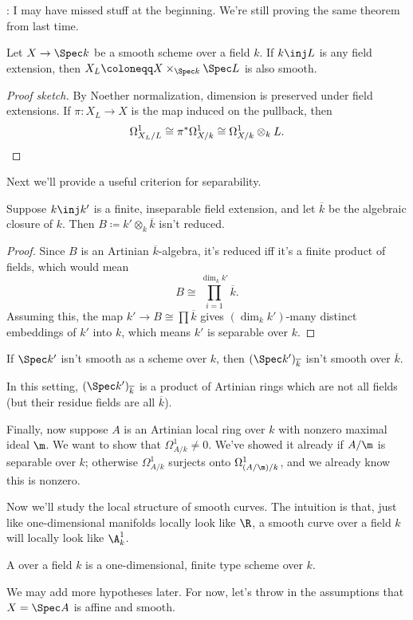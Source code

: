 \TODO: I may have missed stuff at the beginning. We're still proving the same theorem from last time.
\begin{lem}
Let $X\to\Spec k$ be a smooth scheme over a field $k$. If $k\inj L$ is any field extension, then $X_L\coloneqq
X\times_{\Spec k}\Spec L$ is also smooth.
\end{lem}
\begin{proof}[Proof sketch]
By Noether normalization, dimension is preserved under field extensions. If $\pi\colon X_L\to X$ is the map induced
on the pullback, then
\begin{equation}
	\Omega_{X_L/L}^1\cong \pi^*\Omega_{X/k}^1\cong \Omega^1_{X/k}\otimes_k L. \qedhere
\end{equation}
\end{proof}
Next we'll provide a useful criterion for separability.
\begin{lem}
Suppose $k\inj k'$ is a finite, inseparable field extension, and let $\overline k$ be the algebraic closure of $k$.
Then $B\coloneqq k'\otimes_k \overline k$ isn't reduced.
\end{lem}
\begin{proof}
Since $B$ is an Artinian $\overline k$-algebra, it's reduced iff it's a finite product of fields, which would mean
\begin{equation}
	B\cong \prod_{i=1}^{\dim_k k'} \overline k.
\end{equation}
Assuming this, the map $k'\to B\cong\prod \overline k$ gives $(\dim_k k')$-many distinct embeddings of $k'$ into
$k$, which means $k'$ is separable over $k$.
\end{proof}
\begin{cor}
If $\Spec k'$ isn't smooth as a scheme over $k$, then $(\Spec k')_{\overline k}$ isn't smooth over $\overline k$.
\end{cor}
In this setting, $(\Spec k')_{\overline k}$ is a product of Artinian rings which are not all fields (but their
residue fields are all $\overline k$).

Finally, now suppose $A$ is an Artinian local ring over $k$ with nonzero maximal ideal $\m$. We want to show that
$\Omega_{A/k}^1\ne 0$. We've showed it already if $A/\m$ is separable over $k$; otherwise $\Omega_{A/k}^1$ surjects
onto $\Omega_{(A/\m)/k}^1$, and we already know this is nonzero.

\orbreak

Now we'll study the local structure of smooth curves. The intuition is that, just like one-dimensional manifolds
locally look like $\R$, a smooth curve over a field $k$ will locally look like $\A_k^1$.
\begin{defn}
A  over a field $k$ is a one-dimensional, finite type scheme over $k$.
\end{defn}
We may add more hypotheses later. For now, let's throw in the assumptions that $X = \Spec A$ is affine and smooth.

